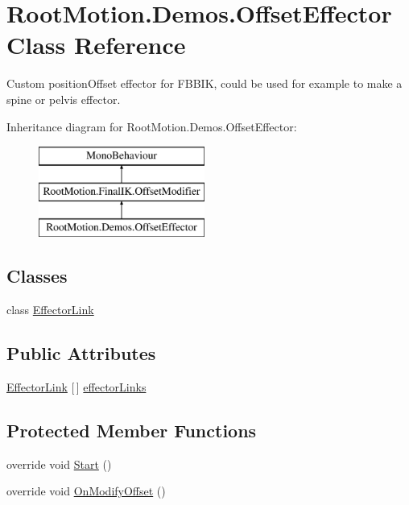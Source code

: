 \hypertarget{class_root_motion_1_1_demos_1_1_offset_effector}{}\section{Root\+Motion.\+Demos.\+Offset\+Effector Class Reference}
\label{class_root_motion_1_1_demos_1_1_offset_effector}


Custom position\+Offset effector for F\+B\+B\+IK, could be used for example to make a spine or pelvis effector.  


Inheritance diagram for Root\+Motion.\+Demos.\+Offset\+Effector\+:\begin{figure}[H]
\begin{center}
\leavevmode
\includegraphics[height=3.000000cm]{class_root_motion_1_1_demos_1_1_offset_effector}
\end{center}
\end{figure}
\subsection*{Classes}
\begin{DoxyCompactItemize}
\item 
class \mbox{\hyperlink{class_root_motion_1_1_demos_1_1_offset_effector_1_1_effector_link}{Effector\+Link}}
\end{DoxyCompactItemize}
\subsection*{Public Attributes}
\begin{DoxyCompactItemize}
\item 
\mbox{\hyperlink{class_root_motion_1_1_demos_1_1_offset_effector_1_1_effector_link}{Effector\+Link}} \mbox{[}$\,$\mbox{]} \mbox{\hyperlink{class_root_motion_1_1_demos_1_1_offset_effector_a50490b95d04d2e076f58e9de4485a634}{effector\+Links}}
\end{DoxyCompactItemize}
\subsection*{Protected Member Functions}
\begin{DoxyCompactItemize}
\item 
override void \mbox{\hyperlink{class_root_motion_1_1_demos_1_1_offset_effector_adf550db6cfb59e9b14f0bb0e464d82bd}{Start}} ()
\item 
override void \mbox{\hyperlink{class_root_motion_1_1_demos_1_1_offset_effector_ac832df1522c8056a353e3506ef3348dc}{On\+Modify\+Offset}} ()
\end{DoxyCompactItemize}
